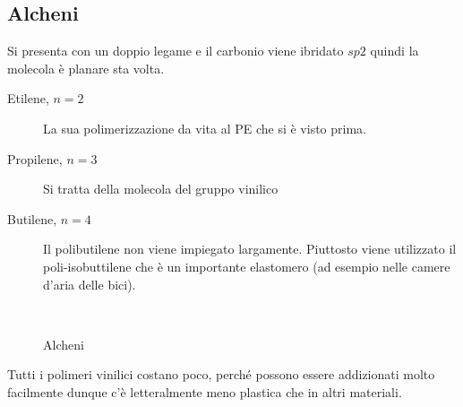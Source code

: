 \subsection{Alcheni}
Si presenta con un doppio legame e il carbonio viene ibridato $sp2$ quindi la molecola è planare sta volta.

\begin{description}
\item[Etilene, $n=2$] 
La sua polimerizzazione da vita al \ac{PE} che si è visto prima.
\item[Propilene, $n=3$] 
Si tratta della molecola del gruppo vinilico
\item[Butilene, $n=4$]
Il polibutilene non viene impiegato largamente. Piuttosto viene utilizzato il poli-isobuttilene che è un importante elastomero (ad esempio nelle camere d'aria delle bici).
\end{description}

\begin{figure}
\centering
{}\quad
{}\\
\caption{Alcheni}
\label{fig:Alcheni}
\end{figure}

Tutti i polimeri vinilici costano poco, perché possono essere addizionati molto facilmente dunque c'è letteralmente meno plastica che in altri materiali.


